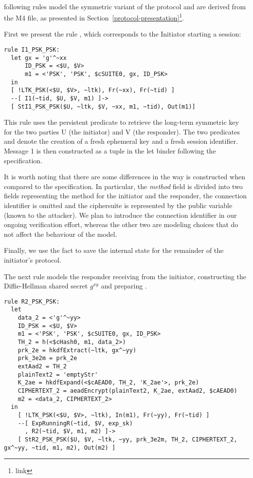 \paragraph{\mPskPsk{}}  following rules model the symmetric  variant of
the protocol and are derived from the M4 file, as presented in
Section~\ref{protocol-presentation}\footnote{link}.

First we present the rule , which corresponds to the
Initiator starting a session:
\begin{lstlisting}
rule I1_PSK_PSK:
  let gx = 'g'^~xx
      ID_PSK = <$U, $V>
      m1 = <'PSK', 'PSK', $cSUITE0, gx, ID_PSK> 
  in
  [ !LTK_PSK(<$U, $V>, ~ltk), Fr(~xx), Fr(~tid) ]
  --[ I1(~tid, $U, $V, m1) ]->
  [ StI1_PSK_PSK($U, ~ltk, $V, ~xx, m1, ~tid), Out(m1)]
\end{lstlisting}

This rule uses the persistent predicate  to retrieve the long-term
symmetric key for the two parties U (the initiator) and V (the responder).  The
two predicates  and  denote the creation of a fresh
ephemeral key and a fresh session identifier.  Message 1 is then constructed as
a tuple in the let binder following the specification.

It is worth noting that there are some differences in the way  is
constructed when compared to the specification. In particular, the \emph{method}
field is divided into two fields representing the method for the initiator and
the responder, the connection identifier is omitted and the ciphersuite is
represented by the public variable
 (known to the attacker). We plan to introduce the connection
identifier \mCi in our ongoing verification effort, whereas the other two are
modeling choices that do not affect the behaviour of the model.

Finally, we use the fact  %
to save the internal state for the remainder of the initiator's protocol.

The next rule models the responder receiving  from the initiator,
constructing the Diffie-Hellman shared secret $g^{xy}$ and preparing .
\begin{lstlisting}
rule R2_PSK_PSK:
  let
    data_2 = <'g'^~yy>
    ID_PSK = <$U, $V>
    m1 = <'PSK', 'PSK', $cSUITE0, gx, ID_PSK>
    TH_2 = h(<$cHash0, m1, data_2>)
    prk_2e = hkdfExtract(~ltk, gx^~yy)
    prk_3e2m = prk_2e
    extAad2 = TH_2
    plainText2 = 'emptyStr'
    K_2ae = hkdfExpand(<$cAEAD0, TH_2, 'K_2ae'>, prk_2e)
    CIPHERTEXT_2 = aeadEncrypt(plainText2, K_2ae, extAad2, $cAEAD0)
    m2 = <data_2, CIPHERTEXT_2>
  in
    [ !LTK_PSK(<$U, $V>, ~ltk), In(m1), Fr(~yy), Fr(~tid) ]
    --[ ExpRunningR(~tid, $V, exp_sk)
      , R2(~tid, $V, m1, m2) ]->
    [ StR2_PSK_PSK($U, $V, ~ltk, ~yy, prk_3e2m, TH_2, CIPHERTEXT_2, gx^~yy, ~tid, m1, m2), Out(m2) ]
\end{lstlisting}

